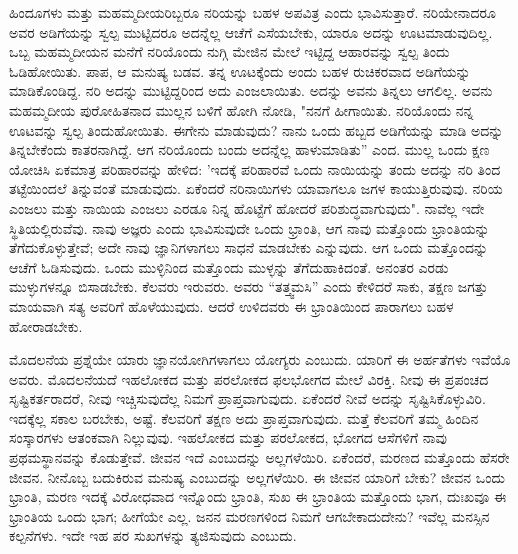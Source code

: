 ಹಿಂದೂಗಳು ಮತ್ತು ಮಹಮ್ಮದೀಯರಿಬ್ಬರೂ ನರಿಯನ್ನು ಬಹಳ ಅಪವಿತ್ರ ಎಂದು ಭಾವಿಸುತ್ತಾರೆ. ನರಿಯೇನಾದರೂ ಅವರ ಅಡಿಗೆಯನ್ನು ಸ್ವಲ್ಪ ಮುಟ್ಟಿದರೂ ಅದನ್ನೆಲ್ಲ ಆಚೆಗೆ ಎಸೆಯಬೇಕು, ಯಾರೂ ಅದನ್ನು ಊಟಮಾಡುವುದಿಲ್ಲ. ಒಬ್ಬ ಮಹಮ್ಮದೀಯನ ಮನೆಗೆ ನರಿಯೊಂದು ನುಗ್ಗಿ ಮೇಜಿನ ಮೇಲೆ ಇಟ್ಟಿದ್ದ ಆಹಾರವನ್ನು ಸ್ವಲ್ಪ ತಿಂದು ಓಡಿಹೋಯಿತು. ಪಾಪ, ಆ ಮನುಷ್ಯ ಬಡವ. ತನ್ನ ಊಟಕ್ಕೆಂದು ಅಂದು ಬಹಳ ರುಚಿಕರವಾದ ಅಡಿಗೆಯನ್ನು ಮಾಡಿಕೊಂಡಿದ್ದ. ನರಿ ಅದನ್ನು ಮುಟ್ಟಿದ್ದರಿಂದ ಅದು ಎಂಜಲಾಯಿತು. ಅದನ್ನು ಅವನು ತಿನ್ನಲು ಆಗಲಿಲ್ಲ. ಅವನು ಮಹಮ್ಮದೀಯ ಪುರೋಹಿತನಾದ ಮುಲ್ಲನ ಬಳಿಗೆ ಹೋಗಿ ನೋಡಿ, "ನನಗೆ ಹೀಗಾಯಿತು. ನರಿಯೊಂದು ನನ್ನ ಊಟವನ್ನು ಸ್ವಲ್ಪ ತಿಂದುಹೋಯಿತು. ಈಗೇನು ಮಾಡುವುದು? ನಾನು ಒಂದು ಹಬ್ಬದ ಅಡಿಗೆಯನ್ನು ಮಾಡಿ ಅದನ್ನು ತಿನ್ನಬೇಕೆಂದು ಕಾತರನಾಗಿದ್ದೆ. ಆಗ ನರಿಯೊಂದು ಬಂದು ಅದನ್ನೆಲ್ಲ ಹಾಳುಮಾಡಿತು'' ಎಂದ. ಮುಲ್ಲ ಒಂದು ಕ್ಷಣ ಯೋಚಿಸಿ ಏಕಮಾತ್ರ ಪರಿಹಾರವನ್ನು ಹೇಳಿದ: 'ಇದಕ್ಕೆ ಪರಿಹಾರವೆ ಒಂದು ನಾಯಿಯನ್ನು ತಂದು ಅದನ್ನು ನರಿ ತಿಂದ ತಟ್ಟೆಯಿಂದಲೆ ತಿನ್ನುವಂತೆ ಮಾಡುವುದು. ಏಕೆಂದರೆ ನರಿನಾಯಿಗಳು ಯಾವಾಗಲೂ ಜಗಳ ಕಾಯುತ್ತಿರುವುವು. ನರಿಯ ಎಂಜಲು ಮತ್ತು ನಾಯಿಯ ಎಂಜಲು ಎರಡೂ ನಿನ್ನ ಹೊಟ್ಟೆಗೆ ಹೋದರೆ ಪರಿಶುದ್ಧವಾಗುವುದು". ನಾವೆಲ್ಲ ಇದೇ ಸ್ಥಿತಿಯಲ್ಲಿರುವೆವು. ನಾವು ಅಜ್ಞರು ಎಂದು ಭಾವಿಸುವುದೇ ಒಂದು ಭ್ರಾಂತಿ, ಆಗ ನಾವು ಮತ್ತೊಂದು ಭ್ರಾಂತಿಯನ್ನು ತೆಗೆದುಕೊಳ್ಳುತ್ತೇವೆ; ಅದೇ ನಾವು ಜ್ಞಾನಿಗಳಾಗಲು ಸಾಧನೆ ಮಾಡಬೇಕು ಎನ್ನುವುದು. ಆಗ ಒಂದು ಮತ್ತೊಂದನ್ನು ಆಚೆಗೆ ಓಡಿಸುವುದು. ಒಂದು ಮುಳ್ಳಿನಿಂದ ಮತ್ತೊಂದು ಮುಳ್ಳನ್ನು ತೆಗೆದುಹಾಕಿದಂತೆ. ಅನಂತರ ಎರಡು ಮುಳ್ಳುಗಳನ್ನೂ ಬಿಸಾಡಬೇಕು. ಕೆಲವರು ಇರುವರು. ಅವರು “ತತ್ತ್ವಮಸಿ'' ಎಂದು ಕೇಳಿದರೆ ಸಾಕು, ತಕ್ಷಣ ಜಗತ್ತು ಮಾಯವಾಗಿ ಸತ್ಯ ಅವರಿಗೆ ಹೊಳೆಯುವುದು. ಆದರೆ ಉಳಿದವರು ಈ ಭ್ರಾಂತಿಯಿಂದ ಪಾರಾಗಲು ಬಹಳ ಹೋರಾಡಬೇಕು.

ಮೊದಲನೆಯ ಪ್ರಶ್ನೆಯೇ ಯಾರು ಜ್ಞಾನಯೋಗಿಗಳಾಗಲು ಯೋಗ್ಯರು ಎಂಬುದು. ಯಾರಿಗೆ ಈ ಅರ್ಹತೆಗಳು ಇವೆಯೊ ಅವರು. ಮೊದಲನೆಯದೆ ಇಹಲೋಕದ ಮತ್ತು ಪರಲೋಕದ ಫಲಭೋಗದ ಮೇಲೆ ವಿರಕ್ತಿ. ನೀವು ಈ ಪ್ರಪಂಚದ ಸೃಷ್ಟಿಕರ್ತರಾದರೆ, ನೀವು ಇಚ್ಚಿಸುವುದೆಲ್ಲ ನಿಮಗೆ ಪ್ರಾಪ್ತವಾಗುವುದು. ಏಕೆಂದರೆ ನೀವೆ ಅದನ್ನು ಸೃಷ್ಟಿಸಿಕೊಳ್ಳುವಿರಿ. ಇದಕ್ಕೆಲ್ಲ ಸಕಾಲ ಬರಬೇಕು, ಅಷ್ಟೆ. ಕೆಲವರಿಗೆ ತಕ್ಷಣ ಅದು ಪ್ರಾಪ್ತವಾಗುವುದು. ಮತ್ತೆ ಕೆಲವರಿಗೆ ತಮ್ಮ ಹಿಂದಿನ ಸಂಸ್ಕಾರಗಳು ಆತಂಕವಾಗಿ ನಿಲ್ಲುವುವು. ಇಹಲೋಕದ ಮತ್ತು ಪರಲೋಕದ, ಭೋಗದ ಆಸೆಗಳಿಗೆ ನಾವು ಪ್ರಥಮಸ್ಥಾನವನ್ನು ಕೊಡುತ್ತೇವೆ. ಜೀವನ ಇದೆ ಎಂಬುದನ್ನು ಅಲ್ಲಗಳೆಯಿರಿ. ಏಕೆಂದರೆ, ಮರಣದ ಮತ್ತೊಂದು ಹೆಸರೇ ಜೀವನ. ನೀನೊಬ್ಬ ಬದುಕಿರುವ ಮನುಷ್ಯ ಎಂಬುದನ್ನು ಅಲ್ಲಗಳೆಯಿರಿ. ಈ ಜೀವನ ಯಾರಿಗೆ ಬೇಕು? ಜೀವನ ಒಂದು ಭ್ರಾಂತಿ, ಮರಣ ಇದಕ್ಕೆ ವಿರೋಧವಾದ ಇನ್ನೊಂದು ಭ್ರಾಂತಿ, ಸುಖ ಈ ಭ್ರಾಂತಿಯ ಮತ್ತೊಂದು ಭಾಗ, ದುಃಖವೂ ಈ ಭ್ರಾಂತಿಯ ಒಂದು ಭಾಗ; ಹೀಗೆಯೇ ಎಲ್ಲ. ಜನನ ಮರಣಗಳಿಂದ ನಿಮಗೆ ಆಗಬೇಕಾದುದೇನು? ಇವೆಲ್ಲ ಮನಸ್ಸಿನ ಕಲ್ಪನೆಗಳು. ಇದೇ ಇಹ ಪರ ಸುಖಗಳನ್ನು ತ್ಯಜಿಸುವುದು ಎಂಬುದು.

